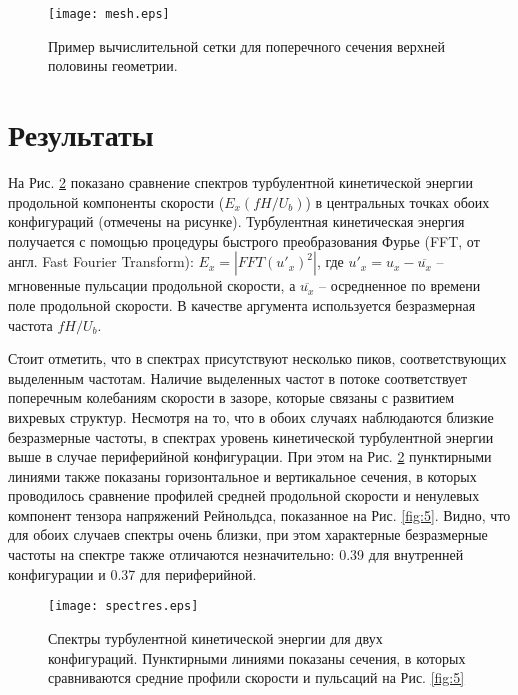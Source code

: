%
\begin{figure}[h!]
  \centering
  \texttt{[image: mesh.eps]}
  \caption{Пример вычислительной сетки для поперечного сечения верхней половины геометрии.}
  \label{fig:3}
\end{figure}


\section{Результаты}\label{ch4:results}
На Рис. \ref{fig:4} показано сравнение спектров турбулентной кинетической энергии 
продольной компоненты скорости ($E_x(fH/U_b)$) в центральных точках обоих конфигураций (отмечены на рисунке). 
%
Турбулентная кинетическая энергия получается с помощью процедуры 
быстрого преобразования Фурье (FFT, от англ. Fast Fourier Transform): 
$E_x = |FFT(u'_x)^2|$, где $u'_x = u_x - \overline{u_x}$ -- мгновенные пульсации продольной скорости, 
а $\overline{u_x}$ -- осредненное по времени поле продольной скорости. 
%
В качестве аргумента используется безразмерная частота $fH/U_b$.

%
Стоит отметить, что в спектрах присутствуют несколько пиков, соответствующих выделенным частотам. 
%
Наличие выделенных частот в потоке соответствует поперечным колебаниям скорости в зазоре, 
которые связаны с развитием вихревых структур. 
%
Несмотря на то, что в обоих случаях наблюдаются близкие безразмерные частоты, 
в спектрах уровень кинетической турбулентной энергии выше в случае периферийной конфигурации.
%
При этом на Рис. \ref{fig:4} пунктирными линиями также показаны горизонтальное и вертикальное сечения, 
в которых проводилось сравнение профилей средней продольной скорости и ненулевых компонент тензора 
напряжений Рейнольдса, показанное на Рис. \ref{fig:5}.
%
Видно, что для обоих случаев спектры очень близки, при этом характерные безразмерные частоты на спектре также 
отличаются незначительно: 0.39 для внутренней конфигурации и 0.37 для периферийной. 
%


\begin{figure}[h!]
  \centering
  \texttt{[image: spectres.eps]}
  \caption{Спектры турбулентной кинетической энергии для двух конфигураций. 
  Пунктирными линиями показаны сечения, в которых сравниваются средние профили 
  скорости и пульсаций на Рис. \ref{fig:5}}
  \label{fig:4}
\end{figure}

